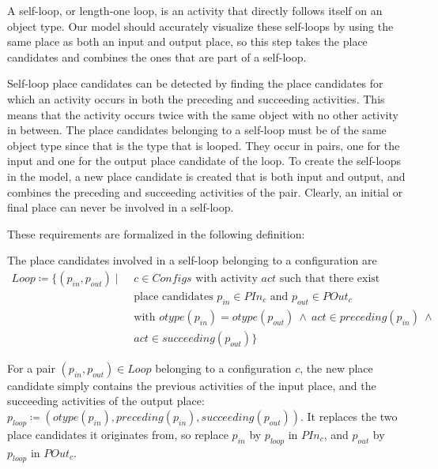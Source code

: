 A self-loop, or length-one loop, is an activity that directly follows itself on an object type.
Our model should accurately visualize these self-loops by using the same place as both an input and output place, so this step takes the place candidates and combines the ones that are part of a self-loop.



Self-loop place candidates can be detected by finding the place candidates for which an activity occurs in both the preceding and succeeding activities.
This means that the activity occurs twice with the same object with no other activity in between.
The place candidates belonging to a self-loop must be of the same object type since that is the type that is looped.
They occur in pairs, one for the input and one for the output place candidate of the loop.
To create the self-loops in the model, a new place candidate is created that is both input and output, and combines the preceding and succeeding activities of the pair.
Clearly, an initial or final place can never be involved in a self-loop.



These requirements are formalized in the following definition:
\begin{definition}
    The place candidates involved in a self-loop belonging to a configuration are
    \begin{align*}
    Loop \coloneqq \{ (p_{in}, p_{out}) \mid\, \, &c \in \mathit{Configs} \text{ with activity } act \text{ such that there exist} \\
    &\text{place candidates } p_{in} \in \mathit{PIn}_c \text{ and } p_{out} \in \mathit{POut}_c \\
    &\text{with } otype(p_{in}) = otype(p_{out}) \ \land\ act \in preceding(p_{in}) \ \land \\
    &act \in succeeding(p_{out}) \}
    \end{align*}
\end{definition}


For a pair $(p_{in}, p_{out}) \in Loop$ belonging to a configuration $c$, the new place candidate simply contains the previous activities of the input place, and the succeeding activities of the output place: $p_{loop} \coloneqq (otype(p_{in}), preceding(p_{in}), succeeding(p_{out}))$.
It replaces the two place candidates it originates from, so replace $p_{in}$ by $p_{loop}$ in $\mathit{PIn}_c$, and $p_{out}$ by $p_{loop}$ in $\mathit{POut}_c$.



